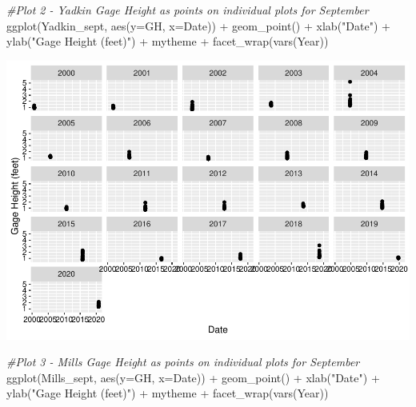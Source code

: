 \documentclass[
  12pt,
]{article}
\newenvironment{Shaded}{\begin{snugshade}}{\end{snugshade}}
\newcommand{\AttributeTok}[1]{\textcolor[rgb]{0.77,0.63,0.00}{#1}}
\newcommand{\CommentTok}[1]{\textcolor[rgb]{0.56,0.35,0.01}{\textit{#1}}}
\newcommand{\FunctionTok}[1]{\textcolor[rgb]{0.00,0.00,0.00}{#1}}
\newcommand{\NormalTok}[1]{#1}
\newcommand{\SpecialCharTok}[1]{\textcolor[rgb]{0.00,0.00,0.00}{#1}}
\newcommand{\StringTok}[1]{\textcolor[rgb]{0.31,0.60,0.02}{#1}}
\begin{document}
\begin{Shaded}
\begin{Highlighting}[]
\CommentTok{\#Plot 2 {-} Yadkin Gage Height as points on individual plots for September}
\FunctionTok{ggplot}\NormalTok{(Yadkin\_sept, }\FunctionTok{aes}\NormalTok{(}\AttributeTok{y=}\NormalTok{GH, }\AttributeTok{x=}\NormalTok{Date)) }\SpecialCharTok{+}
  \FunctionTok{geom\_point}\NormalTok{() }\SpecialCharTok{+}
  \FunctionTok{xlab}\NormalTok{(}\StringTok{"Date"}\NormalTok{) }\SpecialCharTok{+}
  \FunctionTok{ylab}\NormalTok{(}\StringTok{"Gage Height (feet)"}\NormalTok{) }\SpecialCharTok{+}
\NormalTok{  mytheme }\SpecialCharTok{+}
  \FunctionTok{facet\_wrap}\NormalTok{(}\FunctionTok{vars}\NormalTok{(Year)) }
\end{Highlighting}
\end{Shaded}

\includegraphics{Project_Template_files/figure-latex/Plots-2.pdf}

\begin{Shaded}
\begin{Highlighting}[]
\CommentTok{\#Plot 3 {-} Mills Gage Height as points on individual plots for September}
\FunctionTok{ggplot}\NormalTok{(Mills\_sept, }\FunctionTok{aes}\NormalTok{(}\AttributeTok{y=}\NormalTok{GH, }\AttributeTok{x=}\NormalTok{Date)) }\SpecialCharTok{+}
  \FunctionTok{geom\_point}\NormalTok{() }\SpecialCharTok{+}
  \FunctionTok{xlab}\NormalTok{(}\StringTok{"Date"}\NormalTok{) }\SpecialCharTok{+}
  \FunctionTok{ylab}\NormalTok{(}\StringTok{"Gage Height (feet)"}\NormalTok{) }\SpecialCharTok{+}
\NormalTok{  mytheme }\SpecialCharTok{+}
  \FunctionTok{facet\_wrap}\NormalTok{(}\FunctionTok{vars}\NormalTok{(Year)) }
\end{Highlighting}
\end{Shaded}
\end{document}
